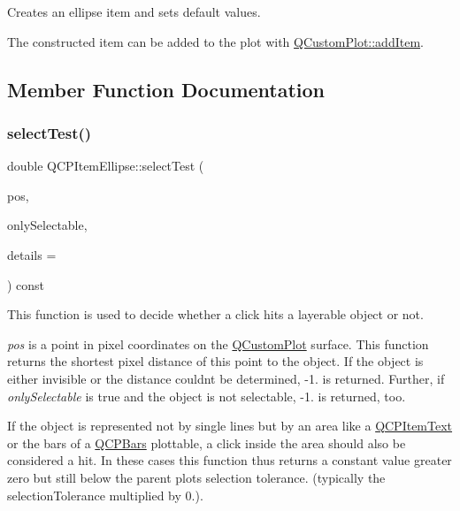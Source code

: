 Creates an ellipse item and sets default values.

The constructed item can be added to the plot with \hyperlink{class_q_custom_plot_aa500620379262321685cb7a7674cbd2a}{Q\+Custom\+Plot\+::add\+Item}. 

\subsection{Member Function Documentation}
\hypertarget{class_q_c_p_item_ellipse_aa41be2180b2ace2e303b88d005c14243}{}\label{class_q_c_p_item_ellipse_aa41be2180b2ace2e303b88d005c14243} 
\subsubsection{\texorpdfstring{select\+Test()}{selectTest()}}
{\footnotesize\ttfamily double Q\+C\+P\+Item\+Ellipse\+::select\+Test (\begin{DoxyParamCaption}\item[{const Q\+PointF \&}]{pos,  }\item[{bool}]{only\+Selectable,  }\item[{Q\+Variant $\ast$}]{details = {} }\end{DoxyParamCaption}) const\hspace{0.3cm}{\ttfamily [virtual]}}

This function is used to decide whether a click hits a layerable object or not.

{\itshape pos} is a point in pixel coordinates on the \hyperlink{class_q_custom_plot}{Q\+Custom\+Plot} surface. This function returns the shortest pixel distance of this point to the object. If the object is either invisible or the distance couldn\textquotesingle{}t be determined, -\/1. is returned. Further, if {\itshape only\+Selectable} is true and the object is not selectable, -\/1. is returned, too.

If the object is represented not by single lines but by an area like a \hyperlink{class_q_c_p_item_text}{Q\+C\+P\+Item\+Text} or the bars of a \hyperlink{class_q_c_p_bars}{Q\+C\+P\+Bars} plottable, a click inside the area should also be considered a hit. In these cases this function thus returns a constant value greater zero but still below the parent plot\textquotesingle{}s selection tolerance. (typically the selection\+Tolerance multiplied by 0.).

